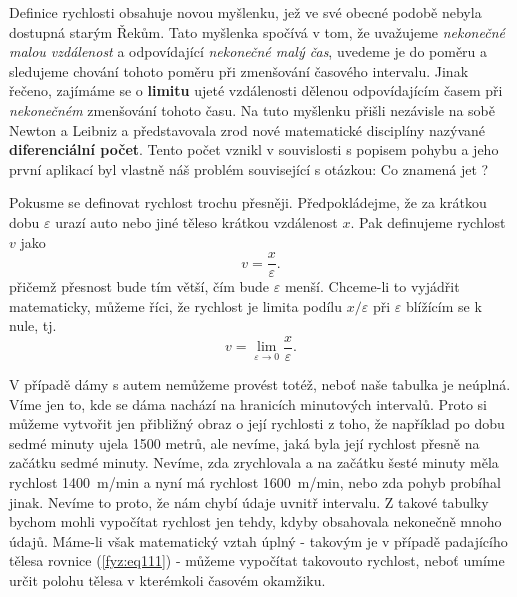     Definice rychlosti obsahuje novou myšlenku, jež ve své obe\-cné podobě nebyla dostupná starým 
    Řekům. Tato myšlenka spočívá v tom, že uvažujeme \emph{nekonečné malou vzdálenost} a 
    odpovídající \emph{nekonečné malý čas}, uvedeme je do poměru a sledujeme chování tohoto poměru 
    při zmenšování časového intervalu. Jinak řečeno, zajímáme se o \textbf{limitu} ujeté 
    vzdálenosti dělenou odpovídajícím časem při \emph{nekonečném} zmenšování tohoto času. Na tuto 
    myšlenku přišli nezávisle na sobě Newton a Leibniz a představovala zrod nové matematické 
    disciplíny nazývané \textbf{diferenciální počet}. Tento počet vznikl v souvislosti s popisem 
    pohybu a jeho první aplikací byl vlastně náš problém související s otázkou: Co znamená jet 
    ?

    Pokusme se definovat rychlost trochu přesněji. Předpokládejme, že za krátkou dobu 
    \(\varepsilon\) urazí auto nebo jiné těleso krátkou vzdálenost \(x\). Pak definujeme rychlost 
    \(v\) jako
    \begin{equation}\label{fyz:eq113}
      v = \frac{x}{\varepsilon}.
    \end{equation}
    přičemž přesnost bude tím větší, čím bude \(\varepsilon\) menší. Chceme-li to vyjádřit 
    matematicky, můžeme říci, že rychlost je limita podílu \(x/\varepsilon\) při \(\varepsilon\) 
    blížícím se k nule, tj.
    \begin{equation}\label{fyz:eq114}
      v = \lim_{\varepsilon\to 0}{\frac{x}{\varepsilon}}.
    \end{equation}
    
    V případě dámy s autem nemůžeme provést totéž, neboť naše tabulka je neúplná. Víme jen to, kde
    se dáma nachází na hranicích minutových intervalů. Proto si můžeme vytvořit jen přibližný obraz
    o její rychlosti z toho, že například po dobu sedmé minuty ujela \num{1500} metrů, ale nevíme,
    jaká byla její rychlost přesně na začátku sedmé minuty. Nevíme, zda zrychlovala a na začátku
    šesté minuty měla rychlost \qty{1400}{\m/\minute} a nyní má rychlost \qty{1600}{\m/\minute},
    nebo zda pohyb probíhal jinak. Nevíme to proto, že nám chybí údaje uvnitř intervalu. Z takové
    tabulky bychom mohli vypočítat rychlost jen tehdy, kdyby obsahovala nekonečně mnoho údajů.
    Máme-li však matematický vztah úplný - takovým je v případě padajícího tělesa rovnice
    (\ref{fyz:eq111}) - můžeme vypočítat takovouto rychlost, neboť umíme určit polohu tělesa v
    kterémkoli časovém okamžiku.
    
